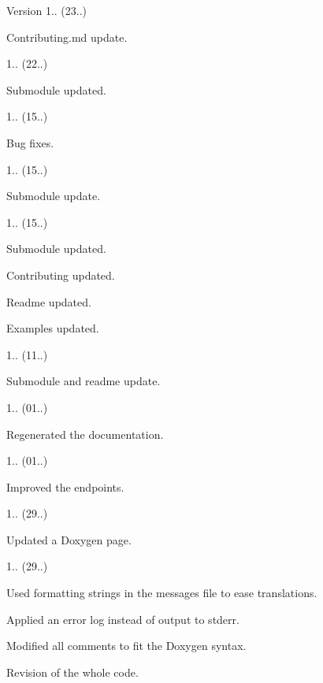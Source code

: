 \begin{DoxyVersion}{Version}
1.. (23..)
\begin{DoxyItemize}
\item Contributing.\+md update. 
\end{DoxyItemize}

1.. (22..)
\begin{DoxyItemize}
\item Submodule updated. 
\end{DoxyItemize}

1.. (15..)
\begin{DoxyItemize}
\item Bug fixes. 
\end{DoxyItemize}

1.. (15..)
\begin{DoxyItemize}
\item Submodule update. 
\end{DoxyItemize}

1.. (15..)
\begin{DoxyItemize}
\item Submodule updated.
\item Contributing updated.
\item Readme updated.
\item Examples updated. 
\end{DoxyItemize}

1.. (11..)
\begin{DoxyItemize}
\item Submodule and readme update. 
\end{DoxyItemize}

1.. (01..)
\begin{DoxyItemize}
\item Regenerated the documentation. 
\end{DoxyItemize}

1.. (01..)
\begin{DoxyItemize}
\item Improved the endpoints. 
\end{DoxyItemize}

1.. (29..)
\begin{DoxyItemize}
\item Updated a Doxygen page. 
\end{DoxyItemize}

1.. (29..)
\begin{DoxyItemize}
\item Used formatting strings in the messages file to ease translations.
\item Applied an error log instead of output to stderr.
\item Modified all comments to fit the Doxygen syntax.
\item Revision of the whole code. 
\end{DoxyItemize}
\end{DoxyVersion}
